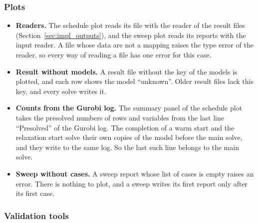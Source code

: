 \documentclass[11pt,a4paper]{article}
\theoremstyle{plain}
\theoremstyle{definition}
\theoremstyle{remark}
\begin{document}
\subsubsection{Plots}
\label{sec:impl_plots}

\begin{itemize}
  \item \textbf{Readers.} The schedule plot reads its file with the reader of the result files (Section~\ref{sec:impl_outputs}), and the sweep plot reads its reports with the input reader.
    A file whose data are not a mapping raises the type error of the reader, so every way of reading a file has one error for this case.
  \item \textbf{Result without models.} A result file without the key of the models is plotted, and each row shows the model ``unknown''.
    Older result files lack this key, and every solve writes it.
  \item \textbf{Counts from the Gurobi log.} The summary panel of the schedule plot takes the presolved numbers of rows and variables from the last line ``Presolved'' of the Gurobi log.
    The completion of a warm start and the relaxation start solve their own copies of the model before the main solve, and they write to the same log.
    So the last such line belongs to the main solve.
  \item \textbf{Sweep without cases.} A sweep report whose list of cases is empty raises an error.
    There is nothing to plot, and a sweep writes its first report only after its first case.
\end{itemize}

\subsubsection{Validation tools}
\label{sec:impl_validation}
\end{document}
